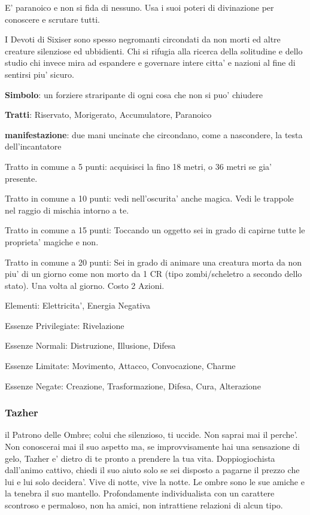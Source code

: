 \documentclass[a4paper,11pt,twoside,openany]{dndbook}
\begin{document}
{E' paranoico e non si fida di nessuno. Usa i suoi poteri di divinazione per conoscere e scrutare tutti.

I Devoti di Sixiser sono spesso negromanti circondati da non morti ed altre creature silenziose ed ubbidienti. Chi si rifugia alla ricerca della solitudine e dello studio chi invece mira ad espandere e governare intere citta' e nazioni al fine di sentirsi piu' sicuro.

\textbf{Simbolo}: un forziere straripante di ogni cosa che non si puo' chiudere

\textbf{Tratti}: Riservato, Morigerato, Accumulatore, Paranoico

\textbf{manifestazione}: due mani uncinate che circondano, come a nascondere, la testa dell'incantatore

\bigskip

Tratto in comune a 5 punti: acquisisci la fino 18 metri, o 36 metri se gia' presente.

Tratto in comune a 10 punti: vedi nell'oscurita' anche magica. Vedi le trappole nel raggio di mischia intorno a te.

Tratto in comune a 15 punti: Toccando un oggetto sei in grado di capirne tutte le proprieta' magiche e non.

Tratto in comune a 20 punti: Sei in grado di animare una creatura morta da non piu' di un giorno come non morto da 1 CR (tipo zombi/scheletro a secondo dello stato). Una volta al giorno. Costo 2 Azioni.

\bigskip

Elementi: Elettricita', Energia Negativa

\bigskip

Essenze Privilegiate: Rivelazione

Essenze Normali: Distruzione, Illusione, Difesa

Essenze Limitate: Movimento, Attacco, Convocazione, Charme

Essenze Negate: Creazione, Trasformazione, Difesa, Cura, Alterazione

\subsubsection{Tazher}

\label{tazher}

il Patrono delle Ombre; colui che silenzioso, ti uccide. Non saprai mai il perche'. Non conoscerai mai il suo aspetto ma, se improvvisamente hai una sensazione di gelo, Tazher e' dietro di te pronto a prendere la tua vita. Doppiogiochista dall'animo cattivo, chiedi il suo aiuto solo se sei disposto a pagarne il prezzo che lui e lui solo decidera'. Vive di notte, vive la notte. Le ombre sono le sue amiche e la tenebra il suo mantello. Profondamente individualista con un carattere scontroso e permaloso, non ha amici, non intrattiene relazioni di alcun tipo.

}
\end{document}

